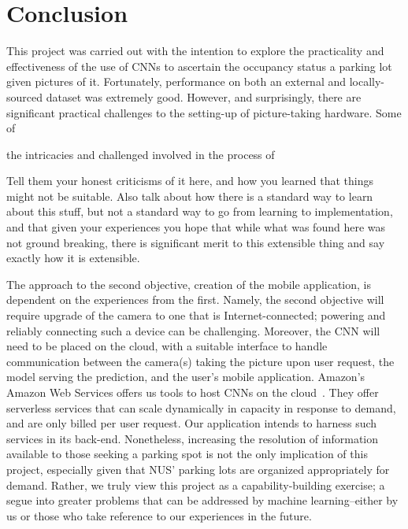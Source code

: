 \documentclass[a4paper, 11pt]{article} %
\begin{document}
\section{Conclusion}
	This project was carried out with the intention to explore the practicality 
	and effectiveness of the use of CNNs to ascertain the occupancy status a 
	parking lot given pictures of it. Fortunately, performance on both an 
	external and locally-sourced dataset was extremely good. However, and 
	surprisingly, there are significant practical challenges to the setting-up 
	of picture-taking hardware. Some of 
	
	the intricacies and challenged involved in the process of 



	Tell them your honest criticisms of it here, and how you learned that things
	might not be suitable.
	Also talk about how there is a standard way to learn about this stuff, but
	not a standard way to go from learning to implementation, and that given your
	experiences you hope that while what was found here was not ground breaking,
	there is significant merit to this extensible thing and say exactly how it is
	extensible.

	The approach to the second objective, creation of the mobile application, is
	dependent on the experiences from the first. Namely, the second objective will
	require upgrade of the camera to one that is Internet-connected; powering and
	reliably connecting such a device can be challenging.  Moreover, the CNN will
	need to be placed on the cloud, with a suitable interface to handle
	communication between the camera(s) taking the picture upon user request, the
	 model serving the prediction, and the user's mobile application. Amazon's
	Amazon Web Services offers us tools to host CNNs on the cloud~\cite{aws}\relax.
	They offer serverless services that can scale dynamically in capacity in
	response to demand, and are only billed per user request. Our application
	intends to harness such services in its back-end.  Nonetheless, increasing the
	resolution of information available to those seeking a parking spot is not the
	only implication of this project, especially given that NUS' parking lots are
	organized appropriately for demand. Rather, we truly view this project as a
	capability-building exercise; a segue into greater problems that can be
	addressed by machine learning--either by us or those who take reference to our
	experiences in the future.
\end{document}
